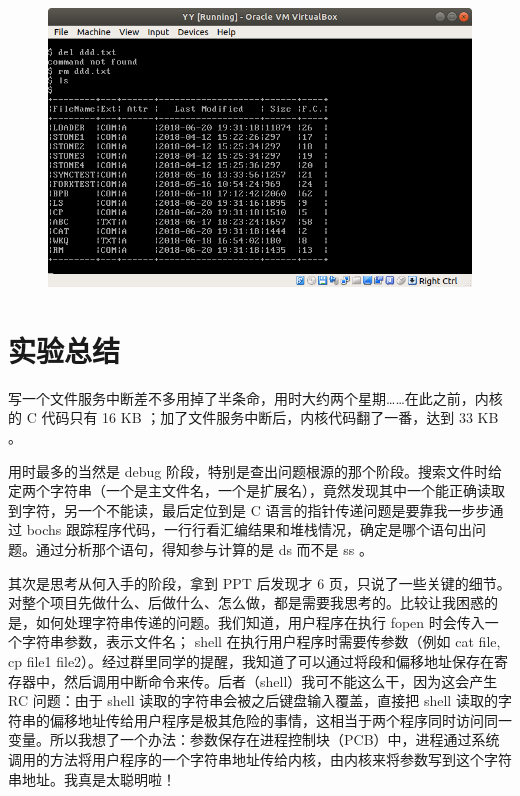 \documentclass[a4paper]{article}
\begin{document}
\begin{figure}[!hbp]
\centering
\includegraphics[scale=0.5]{pics/7.png}
\end{figure}

\section{实验总结}

写一个文件服务中断差不多用掉了半条命，用时大约两个星期……在此之前，内核的 C 代码只有 16 KB ；加了文件服务中断后，内核代码翻了一番，达到 33 KB 。

用时最多的当然是 debug 阶段，特别是查出问题根源的那个阶段。搜索文件时给定两个字符串（一个是主文件名，一个是扩展名），竟然发现其中一个能正确读取到字符，另一个不能读，最后定位到是 C 语言的指针传递问题是要靠我一步步通过 bochs 跟踪程序代码，一行行看汇编结果和堆栈情况，确定是哪个语句出问题。通过分析那个语句，得知参与计算的是 ds 而不是 ss 。

其次是思考从何入手的阶段，拿到 PPT 后发现才 6 页，只说了一些关键的细节。对整个项目先做什么、后做什么、怎么做，都是需要我思考的。比较让我困惑的是，如何处理字符串传递的问题。我们知道，用户程序在执行 fopen 时会传入一个字符串参数，表示文件名； shell 在执行用户程序时需要传参数（例如 cat file, cp file1 file2）。经过群里同学的提醒，我知道了可以通过将段和偏移地址保存在寄存器中，然后调用中断命令来传。后者（shell）我可不能这么干，因为这会产生 RC 问题：由于 shell 读取的字符串会被之后键盘输入覆盖，直接把 shell 读取的字符串的偏移地址传给用户程序是极其危险的事情，这相当于两个程序同时访问同一变量。所以我想了一个办法：参数保存在进程控制块（PCB）中，进程通过系统调用的方法将用户程序的一个字符串地址传给内核，由内核来将参数写到这个字符串地址。我真是太聪明啦！
\end{document}
